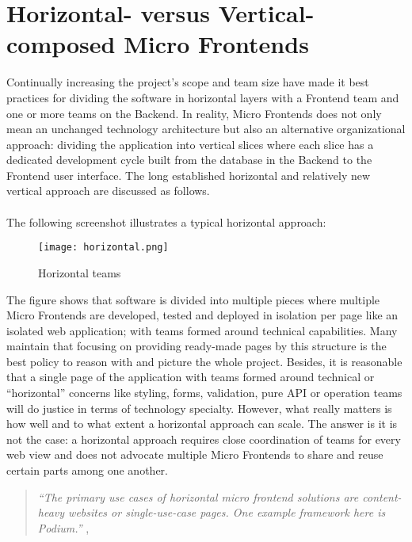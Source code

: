 \documentclass[a4paper]{book}
\begin{document}
\section{Horizontal- versus Vertical-composed Micro Frontends}
Continually increasing the project's scope and team size have made it best practices for dividing the software in horizontal layers with a Frontend team and one or more teams on the Backend. In reality, Micro Frontends does not only mean an unchanged technology architecture but also an alternative organizational approach: dividing the application into vertical slices where each slice has a dedicated development cycle built from the database in the Backend to the Frontend user interface. The long established horizontal and relatively new vertical approach are discussed as follows.
\\
\\
The following screenshot illustrates a typical horizontal approach: 

\begin{figure}[h!]
    \centering
    \captionsetup{justification=centering}
    \texttt{[image: horizontal.png]}
    \caption{Horizontal teams \cite{Rap20}}
    \label{fig:1}
\end{figure}

The figure shows that software is divided into multiple pieces where multiple Micro Frontends are developed, tested and deployed in isolation per page like an isolated web application; with teams formed around technical capabilities. Many maintain that focusing on providing ready-made pages by this structure is the best policy to reason with and picture the whole project. Besides, it is reasonable that a single page of the application with teams formed around technical or “horizontal” concerns like styling, forms, validation, pure API or operation teams will do justice in terms of technology specialty. However, what really matters is how well and to what extent a horizontal approach can scale. The answer is it is not the case: a horizontal approach requires close coordination of teams for every web view and does not advocate multiple Micro Frontends to share and reuse certain parts among one another. \cite{Rap20}
\begin{quote}
    \textit{“The primary use cases of horizontal micro frontend solutions are content-heavy websites or single-use-case pages. One example framework here is Podium.”} \cite{Podium}, \cite{Rap20}
\end{quote}
\end{document}
